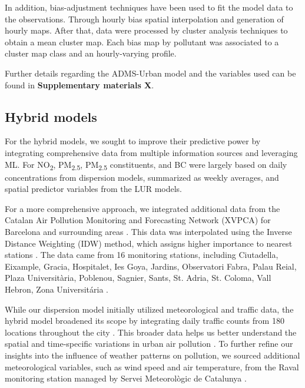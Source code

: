 \documentclass{article}
\begin{document}
In addition, bias-adjustment techniques have been used to fit the model data to the observations. Through hourly bias spatial interpolation and generation of hourly maps. After that, data were processed  by cluster analysis techniques to obtain a mean cluster map. Each bias map by pollutant was associated to a cluster map class and an hourly-varying profile. 

Further details regarding the ADMS-Urban model and the variables used can be found in \textbf{Supplementary materials X}.

\subsection{Hybrid models}

For the hybrid models, we sought to improve their predictive power by integrating comprehensive data from multiple information sources and leveraging ML. For NO\textsubscript{2}, PM\textsubscript{2.5}, PM\textsubscript{2.5} constituents, and BC were largely based on daily concentrations from dispersion models, summarized as weekly averages, and spatial predictor variables from the LUR models. 

For a more comprehensive approach, we integrated additional data from the Catalan Air Pollution Monitoring and Forecasting Network (XVPCA) for Barcelona and surrounding areas \cite{xarxa2012}. This data was interpolated using the Inverse Distance Weighting (IDW) method, which assigns higher importance to nearest stations \cite{hoek2017methods}. The data came from 16 monitoring stations, including Ciutadella, Eixample, Gracia, Hospitalet, Ies Goya, Jardins, Observatori Fabra, Palau Reial, Plaza Universitària, Poblenou, Sagnier, Sants, St. Adria, St. Coloma, Vall Hebron, Zona Universitária \cite{xarxa2012}.

While our dispersion model initially utilized meteorological and traffic data, the hybrid model broadened its scope by integrating daily traffic counts from 180 locations throughout the city \cite{trafficbcn}. This broader data helps us better understand the spatial and time-specific variations in urban air pollution \cite{pinto2020}. To further refine our insights into the influence of weather patterns on pollution, we sourced additional meteorological variables, such as wind speed and air temperature, from the Raval monitoring station managed by Servei Meteorològic de Catalunya \cite{xema2013}.
\end{document}
